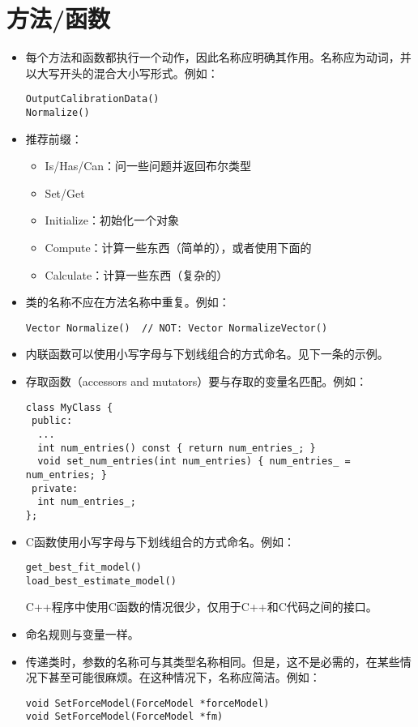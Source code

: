 \section{方法/函数}
\begin{itemize}
  \item 每个方法和函数都执行一个动作，因此名称应明确其作用。名称应为动词，并以大写开头的混合大小写形式。例如：
  \begin{verbatim}
OutputCalibrationData()
Normalize()
  \end{verbatim}
  \item 推荐前缀：
  \begin{itemize}
    \item Is/Has/Can：问一些问题并返回布尔类型
    \item Set/Get
    \item Initialize：初始化一个对象
    \item Compute：计算一些东西（简单的），或者使用下面的
    \item Calculate：计算一些东西（复杂的）
  \end{itemize}
  \item 类的名称不应在方法名称中重复。例如：
  \begin{verbatim}
Vector Normalize()  // NOT: Vector NormalizeVector()
  \end{verbatim}
  \item 内联函数可以使用小写字母与下划线组合的方式命名。见下一条的示例。
  \item 存取函数（accessors and mutators）要与存取的变量名匹配。例如：
  \begin{verbatim}
class MyClass {
 public:
  ...
  int num_entries() const { return num_entries_; }
  void set_num_entries(int num_entries) { num_entries_ = num_entries; }
 private:
  int num_entries_;
};
  \end{verbatim}
  \item C函数使用小写字母与下划线组合的方式命名。例如：
  \begin{verbatim}
get_best_fit_model()
load_best_estimate_model()
  \end{verbatim}

  C++程序中使用C函数的情况很少，仅用于C++和C代码之间的接口。
\end{itemize}
\begin{itemize}
  \item 命名规则与变量一样。
  \item 传递类时，参数的名称可与其类型名称相同。但是，这不是必需的，在某些情况下甚至可能很麻烦。在这种情况下，名称应简洁。例如：
  \begin{verbatim}
void SetForceModel(ForceModel *forceModel)
void SetForceModel(ForceModel *fm)
  \end{verbatim}
\end{itemize}


